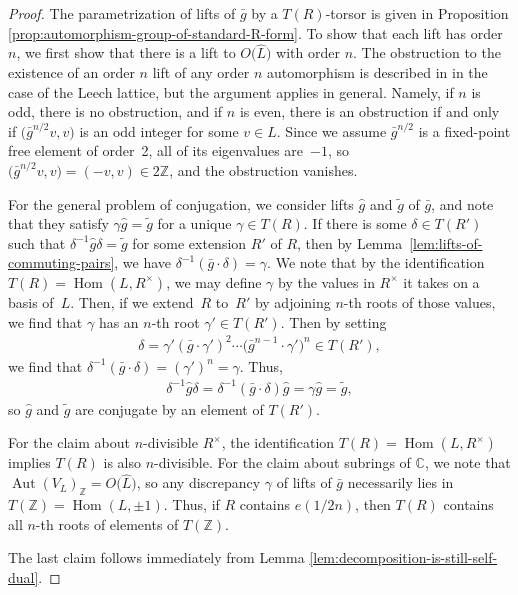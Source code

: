 \documentclass[pdftex]{sigma}
\newcommand{\bC}{\mathbb{C}}
\newcommand{\bZ}{\mathbb{Z}}
\DeclareMathOperator{\Aut}{Aut}
\DeclareMathOperator{\Hom}{Hom}
\theoremstyle{definition}
\begin{document}
\begin{proof}
The parametrization of lifts of $\bar{g}$ by a $T(R)$-torsor is given in Proposition \ref{prop:automorphism-group-of-standard-R-form}. To show that each lift has order $n$, we first show that there is a lift to $O\big(\hat{L}\big)$ with order $n$. The obstruction to the existence of an order $n$ lift of any order $n$ automorphism is described in \cite[Lemma~12.1]{B92} in the case of the Leech lattice, but the argument applies in general. Namely, if $n$ is odd, there is no obstruction, and if $n$ is even, there is an obstruction if and only if $\big(\bar{g}^{n/2}v,v\big)$ is an odd integer for some $v \in L$. Since we assume $\bar{g}^{n/2}$ is a fixed-point free element of order~2, all of its eigenvalues are~$-1$, so $\big(\bar{g}^{n/2}v,v\big) = (-v,v) \in 2\bZ$, and the obstruction vanishes.

For the general problem of conjugation, we consider lifts $\hat{g}$ and $\tilde{g}$ of $\bar{g}$, and note that they satisfy $\gamma \hat{g} = \tilde{g}$ for a unique $\gamma \in T(R)$. If there is some $\delta \in T(R')$ such that $\delta^{-1} \hat{g} \delta = \tilde{g}$ for some extension $R'$ of $R$, then by Lemma~\ref{lem:lifts-of-commuting-pairs}, we have $\delta^{-1}(\bar{g} \cdot \delta) = \gamma$. We note that by the identification $T(R) = \Hom(L,R^\times)$, we may define $\gamma$ by the values in $R^\times$ it takes on a basis of~$L$. Then, if we extend~$R$ to~$R'$ by adjoining $n$-th roots of those values, we find that $\gamma$ has an $n$-th root $\gamma' \in T(R')$. Then by setting
\begin{gather*} \delta = \gamma' (\bar{g} \cdot \gamma')^2 \cdots \big(\bar{g}^{n-1} \cdot \gamma'\big)^n \in T(R'), \end{gather*}
we find that $\delta^{-1}(\bar{g} \cdot \delta) = (\gamma')^n = \gamma$. Thus,
\begin{gather*} \delta^{-1} \hat{g} \delta = \delta^{-1} (\bar{g} \cdot \delta) \hat{g} = \gamma \hat{g} = \tilde{g}, \end{gather*}
so $\hat{g}$ and $\tilde{g}$ are conjugate by an element of $T(R')$.

For the claim about $n$-divisible $R^\times$, the identification $T(R) = \Hom(L,R^\times)$ implies $T(R)$ is also $n$-divisible. For the claim about subrings of $\bC$, we note that $\Aut(V_L)_\bZ = O\big(\hat{L}\big)$, so any discrepancy $\gamma$ of lifts of $\bar{g}$ necessarily lies in $T(\bZ) = \Hom(L,\pm 1)$. Thus, if $R$ contains $e(1/2n)$, then $T(R)$ contains all $n$-th roots of elements of $T(\bZ)$.

The last claim follows immediately from Lemma \ref{lem:decomposition-is-still-self-dual}.
\end{proof}
\end{document}
